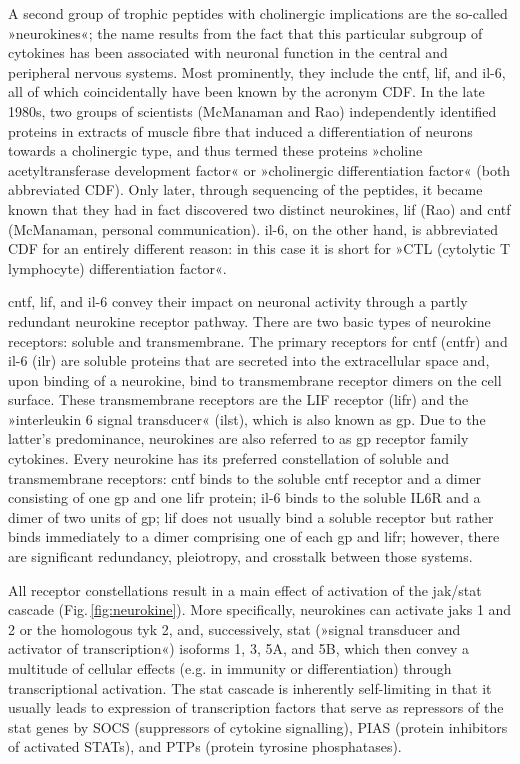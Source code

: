 A second group of trophic peptides with cholinergic implications are the so-called »neurokines«; the name results from the fact that this particular subgroup of cytokines has been associated with neuronal function in the central and peripheral nervous systems. Most prominently, they include the \ac{cntf}, \ac{lif}, and \ac{il}-6, all of which coincidentally have been known by the acronym CDF. In the late 1980s, two groups of scientists (McManaman\cite{McManaman1988} and Rao\cite{Rao1992}) independently identified proteins in extracts of muscle fibre that induced a differentiation of neurons towards a cholinergic type, and thus termed these proteins »choline acetyltransferase development factor« or »cholinergic differentiation factor« (both abbreviated CDF). Only later, through sequencing of the peptides, it became known that they had in fact discovered two distinct neurokines, \ac{lif} (Rao) and \ac{cntf} (McManaman, personal communication). \ac{il}-6, on the other hand, is abbreviated CDF for an entirely different reason: in this case it is short for »CTL (cytolytic T lymphocyte) differentiation factor«.

\ac{cntf}, \ac{lif}, and \ac{il}-6 convey their impact on neuronal activity through a partly redundant neurokine receptor pathway.\cite{Berger2014} There are two basic types of neurokine receptors: soluble and transmembrane. The primary receptors for \ac{cntf} (\acs{cntfr}) and \ac{il}-6 (\acs{ilr}) are soluble proteins that are secreted into the extracellular space and, upon binding of a neurokine, bind to transmembrane receptor dimers on the cell surface. These transmembrane receptors are the LIF receptor (\acs{lifr}) and the »interleukin 6 signal transducer« (\acs{ilst}), which is also known as \acs{gp}. Due to the latter's predominance, neurokines are also referred to as \ac{gp} receptor family cytokines\cite{White2011}. Every neurokine has its preferred constellation of soluble and transmembrane receptors: \ac{cntf} binds to the soluble \ac{cntf} receptor and a dimer consisting of one \ac{gp} and one \ac{lifr} protein; \ac{il}-6 binds to the soluble IL6R and a dimer of two units of \ac{gp}; \ac{lif} does not usually bind a soluble receptor but rather binds immediately to a dimer comprising one of each \ac{gp} and \ac{lifr}; however, there are significant redundancy, pleiotropy, and crosstalk between those systems.\cite{Rawlings2004, White2011, Nathanson2012}

All receptor constellations result in a main effect of activation of the \acs{jak}/\acs{stat} cascade (Fig.\,\ref{fig:neurokine}). More specifically, neurokines can activate \acfp{jak} 1 and 2 or the homologous \ac{tyk} 2, and, successively, \ac{stat} (»signal transducer and activator of transcription«) isoforms 1, 3, 5A, and 5B, which then convey a multitude of cellular effects (e.g. in immunity or differentiation) through transcriptional activation. The \ac{stat} cascade is inherently self-limiting in that it usually leads to expression of transcription factors that serve as repressors of the \ac{stat} genes by SOCS (suppressors of cytokine signalling), PIAS (protein inhibitors of activated STATs), and PTPs (protein tyrosine phosphatases).\cite{Rawlings2004}

